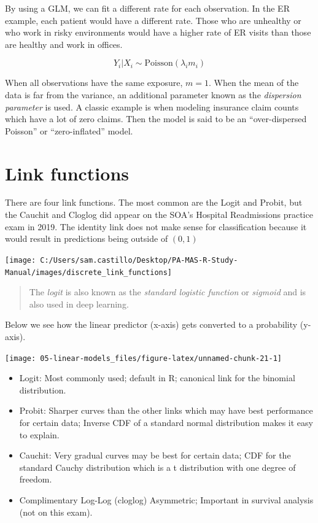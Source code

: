 \documentclass[
  openany]{book}
\providecommand{\tightlist}{%
  \setlength{\itemsep}{0pt}\setlength{\parskip}{0pt}}
\begin{document}
By using a GLM, we can fit a different rate for each observation. In the ER example, each patient would have a different rate. Those who are unhealthy or who work in risky environments would have a higher rate of ER visits than those are healthy and work in offices.

\[Y_i|X_i \sim \text{Poisson}(\lambda_i m_i)\]

When all observations have the same exposure, \(m = 1\). When the mean of the data is far from the variance, an additional parameter known as the \emph{dispersion parameter} is used. A classic example is when modeling insurance claim counts which have a lot of zero claims. Then the model is said to be an ``over-dispersed Poisson'' or ``zero-inflated'' model.

\hypertarget{link-functions}{%
\section{Link functions}\label{link-functions}}

There are four link functions. The most common are the Logit and Probit, but the Cauchit and Cloglog did appear on the SOA's Hospital Readmissions practice exam in 2019. The identity link does not make sense for classification because it would result in predictions being outside of \((0,1)\)

\begin{center}\texttt{[image: C:/Users/sam.castillo/Desktop/PA-MAS-R-Study-Manual/images/discrete\_link\_functions]} \end{center}

\begin{quote}
The \emph{logit} is also known as the \emph{standard logistic function} or \emph{sigmoid} and is also used in deep learning.
\end{quote}

Below we see how the linear predictor (x-axis) gets converted to a probability (y-axis).

\begin{center}\texttt{[image: 05-linear-models\_files/figure-latex/unnamed-chunk-21-1]} \end{center}

\begin{itemize}
\tightlist
\item
  {Logit: } Most commonly used; default in R; canonical link for the binomial distribution.
\item
  {Probit: } Sharper curves than the other links which may have best performance for certain data; Inverse CDF of a standard normal distribution makes it easy to explain.
\item
  {Cauchit: } Very gradual curves may be best for certain data; CDF for the standard Cauchy distribution which is a t distribution with one degree of freedom.
\item
  {Complimentary Log-Log (cloglog)} Asymmetric; Important in survival analysis (not on this exam).
\end{itemize}
\end{document}
